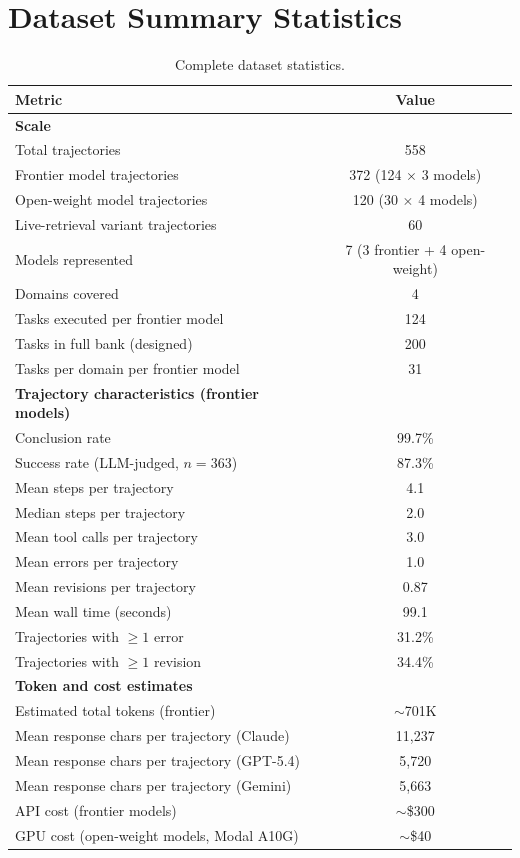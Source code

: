 \documentclass{article}
\begin{document}
\section{Dataset Summary Statistics}
\label{app:stats}

\begin{table}[h]
\caption{Complete dataset statistics.}
\label{tab:stats}
\centering\small
\begin{tabular}{lc}
\toprule
\textbf{Metric} & \textbf{Value} \\
\midrule
\textbf{Scale} \\
\quad Total trajectories & 558 \\
\quad Frontier model trajectories & 372 (124 $\times$ 3 models) \\
\quad Open-weight model trajectories & 120 (30 $\times$ 4 models) \\
\quad Live-retrieval variant trajectories & 60 \\
\quad Models represented & 7 (3 frontier + 4 open-weight) \\
\quad Domains covered & 4 \\
\quad Tasks executed per frontier model & 124 \\
\quad Tasks in full bank (designed) & 200 \\
\quad Tasks per domain per frontier model & 31 \\
\midrule
\textbf{Trajectory characteristics (frontier models)} \\
\quad Conclusion rate & 99.7\% \\
\quad Success rate (LLM-judged, $n{=}363$) & 87.3\% \\
\quad Mean steps per trajectory & 4.1 \\
\quad Median steps per trajectory & 2.0 \\
\quad Mean tool calls per trajectory & 3.0 \\
\quad Mean errors per trajectory & 1.0 \\
\quad Mean revisions per trajectory & 0.87 \\
\quad Mean wall time (seconds) & 99.1 \\
\quad Trajectories with $\geq 1$ error & 31.2\% \\
\quad Trajectories with $\geq 1$ revision & 34.4\% \\
\midrule
\textbf{Token and cost estimates} \\
\quad Estimated total tokens (frontier) & ${\sim}$701K \\
\quad Mean response chars per trajectory (Claude) & 11,237 \\
\quad Mean response chars per trajectory (GPT-5.4) & 5,720 \\
\quad Mean response chars per trajectory (Gemini) & 5,663 \\
\quad API cost (frontier models) & ${\sim}$\$300 \\
\quad GPU cost (open-weight models, Modal A10G) & ${\sim}$\$40 \\
\bottomrule
\end{tabular}
\end{table}
\end{document}
